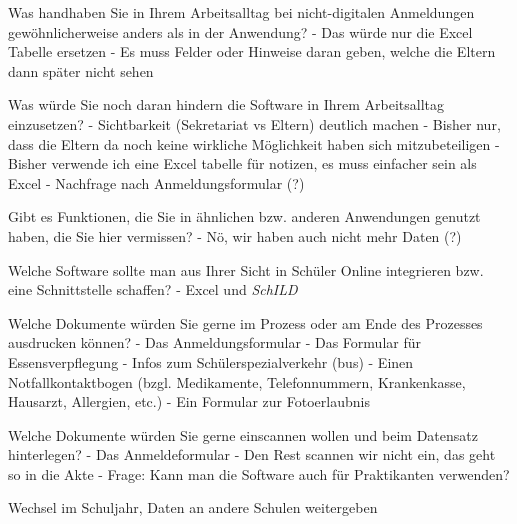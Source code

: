 Was handhaben Sie in Ihrem Arbeitsalltag bei nicht-digitalen Anmeldungen gewöhnlicherweise anders als in der Anwendung?		
- Das würde nur die Excel Tabelle ersetzen
- Es muss Felder oder Hinweise daran geben, welche die Eltern dann später nicht sehen














Was würde Sie noch daran hindern die Software in Ihrem Arbeitsalltag einzusetzen?	
 - Sichtbarkeit (Sekretariat vs Eltern) deutlich machen		
- Bisher nur, dass die Eltern da noch keine wirkliche Möglichkeit haben sich mitzubeteiligen
- Bisher verwende ich eine Excel tabelle für notizen, es muss einfacher sein als Excel
- Nachfrage nach Anmeldungsformular (?)














Gibt es Funktionen, die Sie in ähnlichen bzw. anderen Anwendungen genutzt haben, die Sie hier vermissen?		
- Nö, wir haben auch nicht mehr Daten (?)









Welche Software sollte man aus Ihrer Sicht in Schüler Online integrieren bzw. eine Schnittstelle schaffen? 		
- Excel und  \textit{SchILD} 



						
Welche Dokumente würden Sie gerne im Prozess oder am Ende des Prozesses ausdrucken können?		
- Das Anmeldungsformular
- Das Formular für Essensverpflegung
- Infos zum Schülerspezialverkehr (bus)
- Einen Notfallkontaktbogen (bzgl. Medikamente, Telefonnummern, Krankenkasse, Hausarzt, Allergien, etc.)
- Ein Formular zur Fotoerlaubnis

Welche Dokumente würden Sie gerne einscannen wollen und beim Datensatz hinterlegen?
- Das Anmeldeformular 
- Den Rest scannen wir nicht ein, das geht so in die Akte
- Frage: Kann man die Software auch für Praktikanten verwenden?


Wechsel im Schuljahr, Daten an andere Schulen weitergeben
					